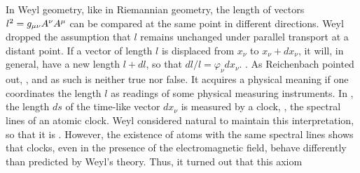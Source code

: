 \documentclass[final]{article}
\newcommand{\phin}{\ensuremath{\varphi_\nu}\xspace}
\newcommand{\WT}{Weyl's theory\xspace}
\newcommand{\WG}{Weyl geometry\xspace}
\begin{document}
\begin{W}
\item\label{W1} In \WG, like in Riemannian geometry, the length of vectors  $l^2=g_{\mu\nu} A^\nu A^\mu$ can be compared at the same point in different directions. Weyl dropped the assumption that $l$ remains unchanged under parallel transport at a distant point. If a vector of length $l$ is displaced from $x_\nu$ to $x_\nu+dx_\nu$, it will, in general, have a new length $l+dl$, so that $dl/l=\phin dx_\nu$. . As Reichenbach pointed out,  \citep[366]{Reichenbach1922a}, and as such is neither true nor false. It acquires a physical meaning if one coordinates the length $l$ as readings of some physical measuring instruments. In \gr, the length $ds$ of the time-like vector $dx_\nu$ is measured by a clock, \eg, the spectral lines of an atomic clock. Weyl considered natural to maintain this interpretation, so that it is  \citep[366]{Reichenbach1922a}. However, the existence of atoms with the same spectral lines shows that clocks, even in the presence of the electromagnetic field, behave differently than predicted by \WT. Thus, it turned out that this axiom   \citep[366]{Reichenbach1922a}


\end{W}
\end{document}
